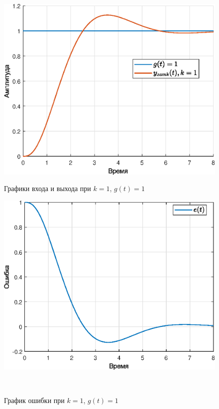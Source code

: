 \documentclass[a4paper]{article}
\begin{document}
\begin{figure}[H]
    \begin{minipage}{0.5\textwidth}
        \centering \includegraphics[width=\textwidth]{ex4/k1_g_a.eps}
        \caption{Графики входа и выхода при $k=1$, $g(t)=1$}
    \end{minipage}\hfill
    \begin{minipage}{0.5\textwidth}
        \centering \includegraphics[width=\textwidth]{ex4/k1_g_a_error.eps}
        \caption{График ошибки при $k=1$, $g(t)=1$}
    \end{minipage}\\[1em]
\end{figure}\noindent\
\end{document}
